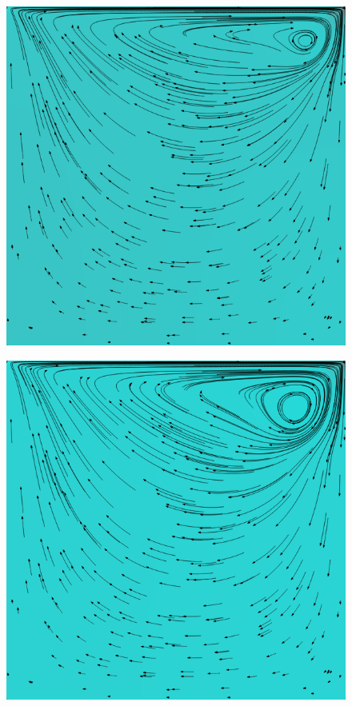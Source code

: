 		\begin{frame}
			\begin{figure}
				\centering
				\includegraphics[scale=0.4]{images/re-1000-512-01069.png}
			\end{figure}
		\end{frame}

		\begin{frame}
			\begin{figure}
				\centering
				\includegraphics[scale=0.4]{images/re-1000-512-01555.png}
			\end{figure}
		\end{frame}


